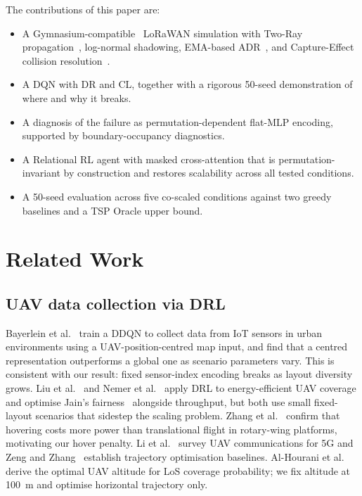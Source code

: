 \documentclass[conference]{IEEEtran}
\begin{document}
The contributions of this paper are:
\begin{itemize}
    \item A Gymnasium-compatible~\cite{towers2024gymnasium} LoRaWAN simulation with Two-Ray propagation~\cite{rappaport2002wireless}, log-normal shadowing, EMA-based ADR~\cite{slabicki2018adaptive,augustin2016lora}, and Capture-Effect collision resolution~\cite{croce2020lora,reynders2016range}.
    \item A DQN with DR and CL, together with a rigorous 50-seed demonstration of where and why it breaks.
    \item A diagnosis of the failure as permutation-dependent flat-MLP encoding, supported by boundary-occupancy diagnostics.
    \item A Relational RL agent with masked cross-attention that is permutation-invariant by construction and restores scalability across all tested conditions.
    \item A 50-seed evaluation across five co-scaled conditions against two greedy baselines and a TSP Oracle upper bound.
\end{itemize}

\section{Related Work}

\subsection{UAV data collection via DRL}

Bayerlein et al.~\cite{bayerlein2020uav} train a DDQN to collect data from IoT sensors in urban environments using a UAV-position-centred map input, and find that a centred representation outperforms a global one as scenario parameters vary. This is consistent with our result: fixed sensor-index encoding breaks as layout diversity grows. Liu et al.~\cite{liu2019uav} and Nemer et al.~\cite{nemer2022energyefficient} apply DRL to energy-efficient UAV coverage and optimise Jain's fairness~\cite{jain1984quantitative} alongside throughput, but both use small fixed-layout scenarios that sidestep the scaling problem. Zhang et al.~\cite{zhang2021energy} confirm that hovering costs more power than translational flight in rotary-wing platforms, motivating our hover penalty. Li et al.~\cite{li2020uav} survey UAV communications for 5G and Zeng and Zhang~\cite{zeng2017energy} establish trajectory optimisation baselines. Al-Hourani et al.~\cite{alhourani2014optimal} derive the optimal UAV altitude for LoS coverage probability; we fix altitude at 100~m and optimise horizontal trajectory only.
\end{document}
